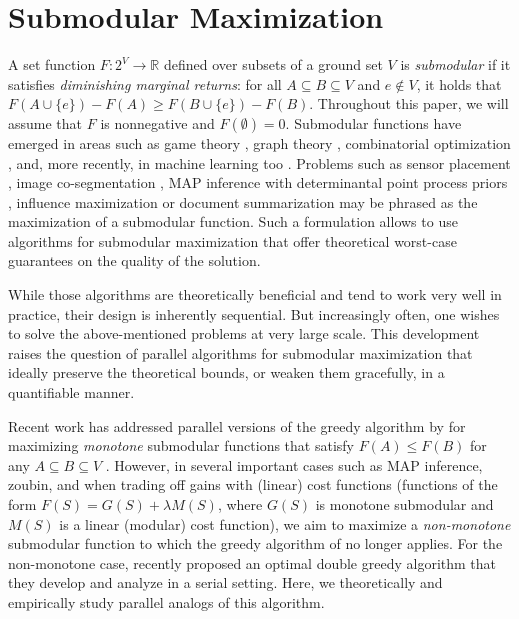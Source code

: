 \documentclass{article} %
\newcommand{\union}{\cup}
\begin{document}
\section{Submodular Maximization \label{sec:submodularmax}}
A set function $F: 2^V \to \mathbb{R}$ defined over subsets of a ground set $V$ is \emph{submodular} if it satisfies \emph{diminishing marginal returns}: for all $A \subseteq B \subseteq V$ and  $e \notin V$, it holds that $F(A \union \{e\}) - F(A) \geq F(B \union \{e\}) - F(B)$. Throughout this paper, we will assume that $F$ is nonnegative and $F(\emptyset)=0$. Submodular functions have emerged in areas such as game theory \cite{shapley71}, graph theory \cite{frank93}, combinatorial optimization \cite{schrijver02}, %
and, more recently, in machine learning too \cite{tutorial,tutorial2}. Problems such as sensor placement \cite{krauseGuestrin11}, image co-segmentation \cite{kim11}, MAP inference with determinantal point process priors \cite{gillenwater12}, influence maximization \cite{kkt03} or document summarization \cite{lin11} may be phrased as the maximization of a submodular function. Such a formulation allows to use algorithms for submodular maximization \cite{buchbinder2012,nemhauser1978} that offer theoretical worst-case guarantees on the quality of the solution.

While those algorithms are theoretically beneficial and tend to work very well in practice, their design is inherently sequential. But increasingly often, one wishes to solve the above-mentioned problems at very large scale. This development raises the question of parallel algorithms for submodular maximization that ideally preserve the theoretical bounds, or weaken them gracefully, in a quantifiable manner. 

Recent work has addressed parallel versions of the greedy algorithm by \citet{nemhauser1978} for maximizing \emph{monotone} submodular functions that satisfy $F(A) \leq F(B)$ for any $A \subseteq B \subseteq V$ \cite{Mirzasoleiman2013,kumar13}. However, in several important cases such as MAP inference, zoubin, and when trading off gains with (linear) cost functions (functions of the form $F(S) = G(S) + \lambda M(S)$, where $G(S)$ is monotone submodular and $M(S)$ is a linear (modular) cost function), we aim to maximize a \emph{non-monotone} submodular function to which the greedy algorithm of \cite{} no longer applies. For the non-monotone case, \citet{buchbinder2012} recently proposed an optimal double greedy algorithm that they develop and analyze in a serial setting. Here, we theoretically and empirically study parallel analogs of this algorithm.
\end{document}
